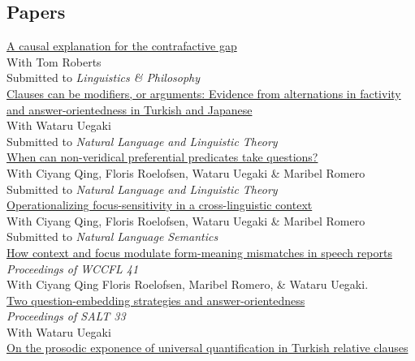 \documentclass[11pt, a4paper]{article} %
\newcommand{\years}[1]{\marginnote{\scriptsize #1}} %
\begin{document}
\subsection*{Papers}
\years{in~prep} \href{https://ling.auf.net/lingbuzz/009050}{A causal explanation
for the contrafactive gap} \\
With Tom Roberts \\
Submitted to \emph{Linguistics \& Philosophy} \\[.25em]
\href{https://ling.auf.net/lingbuzz/008187}{Clauses can be modifiers, or arguments: Evidence from
alternations in factivity and answer-orientedness in Turkish and Japanese} \\
With Wataru Uegaki  \\
Submitted to \emph{Natural Language and Linguistic Theory} \\[.25em]
\href{https://ling.auf.net/lingbuzz/008113}{When can non-veridical preferential predicates take questions?} \\
With Ciyang Qing, Floris Roelofsen, Wataru Uegaki \& Maribel Romero \\
Submitted to \emph{Natural Language and Linguistic Theory} \\[.25em]
\href{https://ling.auf.net/lingbuzz/007004}{Operationalizing focus-sensitivity in a cross-linguistic context} \\ 
With Ciyang Qing, Floris Roelofsen, Wataru Uegaki \& Maribel Romero \\
Submitted to \emph{Natural Language Semantics} \\[.25em]
\years{2025} \href{http://www.lingref.com/cpp/wccfl/41/paper3783.pdf}{How context and focus modulate form-meaning mismatches in speech
reports} \\
\emph{Proceedings of WCCFL 41} \\
With Ciyang Qing Floris Roelofsen, Maribel Romero, \& Wataru Uegaki. \\[.25em]
\years{2023} \href{https://osf.io/preprints/psyarxiv/dbh4z/}{Two question-embedding strategies and
answer-oriented\-ness} \\
\emph{Proceedings of SALT 33} \\
With Wataru Uegaki \\[.25em]
\years{} \href{https://www.mdpi.com/2226-471X/8/3/170}{On the prosodic
exponence of universal quantification in Turkish relative clauses} \\
\end{document}
